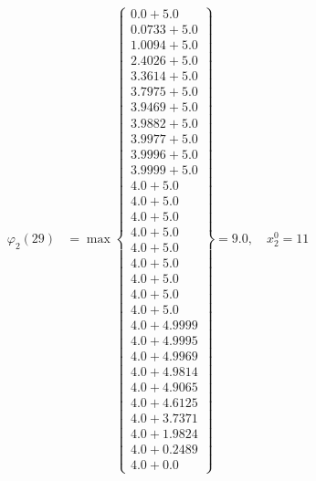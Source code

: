 \documentclass{article}
\begin{document}
\begin{align*}
  
\varphi_{2}(29) &= \max \left\{ \begin{array}{c}
0.0 + 5.0 \\
 0.0733 + 5.0 \\
 1.0094 + 5.0 \\
 2.4026 + 5.0 \\
 3.3614 + 5.0 \\
 3.7975 + 5.0 \\
 3.9469 + 5.0 \\
 3.9882 + 5.0 \\
 3.9977 + 5.0 \\
 3.9996 + 5.0 \\
 3.9999 + 5.0 \\
 4.0 + 5.0 \\
 4.0 + 5.0 \\
 4.0 + 5.0 \\
 4.0 + 5.0 \\
 4.0 + 5.0 \\
 4.0 + 5.0 \\
 4.0 + 5.0 \\
 4.0 + 5.0 \\
 4.0 + 5.0 \\
 4.0 + 4.9999 \\
 4.0 + 4.9995 \\
 4.0 + 4.9969 \\
 4.0 + 4.9814 \\
 4.0 + 4.9065 \\
 4.0 + 4.6125 \\
 4.0 + 3.7371 \\
 4.0 + 1.9824 \\
 4.0 + 0.2489 \\
 4.0 + 0.0
\end{array} \right\}=9.0,\quad x_{2}^0=11\\
  
  
  

\end{align*}
\end{document}
